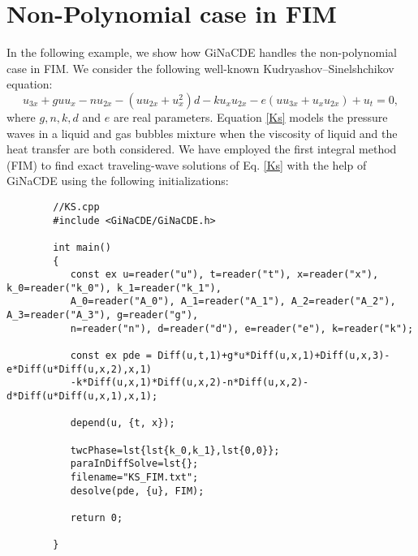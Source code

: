 \documentclass[prd,aps,floats,showkeys,nofootinbib,notitlepage]{revtex4}
\begin{document}
	\section{Non-Polynomial case in FIM}
	In the following example, we show how GiNaCDE handles the non-polynomial case in FIM. We consider the following well-known Kudryashov–Sinelshchikov equation: %
	\begin{equation}\label{Ks}
		{u_{3x}} + gu{u_x} - n{u_{2x}} - \left( {u{u_{2x}} + u_x^2} \right)d - k{u_x}{u_{2x}} - e\left( {u{u_{3x}} + {u_x}{u_{2x}}} \right) + {u_t}=0,
	\end{equation}
	where $g,n,k,d$ and $e$ are real parameters. Equation \eqref{Ks} models the pressure waves in a liquid and gas bubbles mixture when the viscosity of liquid and the heat transfer are both considered. We have employed the first integral method (FIM) to find exact traveling-wave solutions of Eq. \eqref{Ks} with the help of GiNaCDE using the following initializations:
	\begin{verbatim}
		//KS.cpp
		#include <GiNaCDE/GiNaCDE.h>
				
		int main()
		{
		   const ex u=reader("u"), t=reader("t"), x=reader("x"), k_0=reader("k_0"), k_1=reader("k_1"), 
		   A_0=reader("A_0"), A_1=reader("A_1"), A_2=reader("A_2"), A_3=reader("A_3"), g=reader("g"), 
		   n=reader("n"), d=reader("d"), e=reader("e"), k=reader("k");
		
		   const ex pde = Diff(u,t,1)+g*u*Diff(u,x,1)+Diff(u,x,3)-e*Diff(u*Diff(u,x,2),x,1)
		   -k*Diff(u,x,1)*Diff(u,x,2)-n*Diff(u,x,2)-d*Diff(u*Diff(u,x,1),x,1);
		
		   depend(u, {t, x});
		
		   twcPhase=lst{lst{k_0,k_1},lst{0,0}};
		   paraInDiffSolve=lst{};
		   filename="KS_FIM.txt";
		   desolve(pde, {u}, FIM);
		
		   return 0;
			
		}
	
	\end{verbatim}
	
\end{document}
